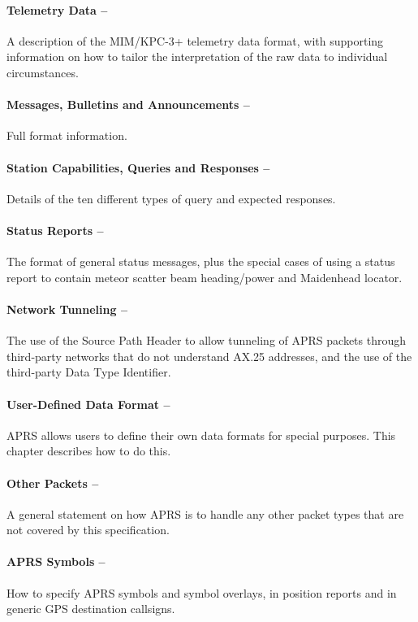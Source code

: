 \paragraph{Telemetry Data --}A description of the MIM/KPC-3+ telemetry data
format, with supporting information on how to tailor the interpretation of the
raw data to individual circumstances.

\paragraph{Messages, Bulletins and Announcements --}Full format information.

\paragraph{Station Capabilities, Queries and Responses --}Details of the ten different
types of query and expected responses.

\paragraph{Status Reports --}The format of general status messages, plus the special
cases of using a status report to contain meteor scatter beam heading/power
and Maidenhead locator.

\paragraph{Network Tunneling --}The use of the Source Path Header to allow
tunneling of APRS packets through third-party networks that do not
understand AX.25 addresses, and the use of the third-party Data Type
Identifier.

\paragraph{User-Defined Data Format --}APRS allows users to define their own data
formats for special purposes. This chapter describes how to do this.

\paragraph{Other Packets --} A general statement on how APRS is to handle any other
packet types that are not covered by this specification.

\paragraph{APRS Symbols --}How to specify APRS symbols and symbol overlays, in
position reports and in generic GPS destination callsigns.


